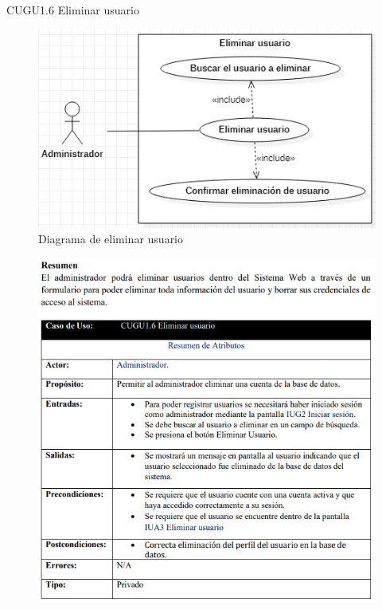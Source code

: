 \documentclass[12pt,letterpaper]{article}
\begin{document}
            \newpage
            CUGU1.6 Eliminar usuario 
            \begin{figure}[H]
                \centering
                \includegraphics [scale=0.5]{casosUso/eliminarUsuario}
                \caption{Diagrama de eliminar usuario}
            \end{figure}
            \begin{figure}[H]
                \centering
                \includegraphics [scale=0.8]{specs/specEliminarUsuario}
            \end{figure}
\end{document}
